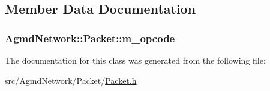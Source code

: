 \subsection{Member Data Documentation}
\hypertarget{class_agmd_network_1_1_packet_abf0dd089350b6fa9ee036f7807af5139}{
\subsubsection[{m\+\_\+opcode}]{ Agmd\+Network\+::\+Packet\+::m\+\_\+opcode\hspace{0.3cm}{\ttfamily [protected]}}}\label{class_agmd_network_1_1_packet_abf0dd089350b6fa9ee036f7807af5139}


The documentation for this class was generated from the following file\+:\begin{DoxyCompactItemize}
\item 
src/\+Agmd\+Network/\+Packet/\hyperlink{_packet_8h}{Packet.\+h}\end{DoxyCompactItemize}
